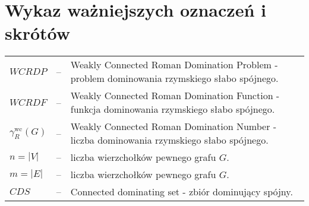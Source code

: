 \chapter*{Wykaz ważniejszych oznaczeń i skrótów}

\begin{tabular}{@{} l l p{} @{}}
    $WCRDP$ & -- & Weakly Connected Roman Domination Problem - problem dominowania rzymskiego słabo spójnego.\\
    $WCRDF$ & -- & Weakly Connected Roman Domination Function - funkcja dominowania rzymskiego słabo spójnego. \\
    $\gamma_{R}^{\text{wc}}(G)$ & -- & Weakly Connected Roman Domination Number - liczba dominowania rzymskiego słabo spójnego. \\
    $n = |V|$ & -- & liczba wierzchołków pewnego grafu $G$.\\
    $m = |E|$ & -- & liczba wierzchołków pewnego grafu $G$.\\
    $CDS$ & -- & Connected dominating set - zbiór dominujący spójny.\\
\end{tabular}
